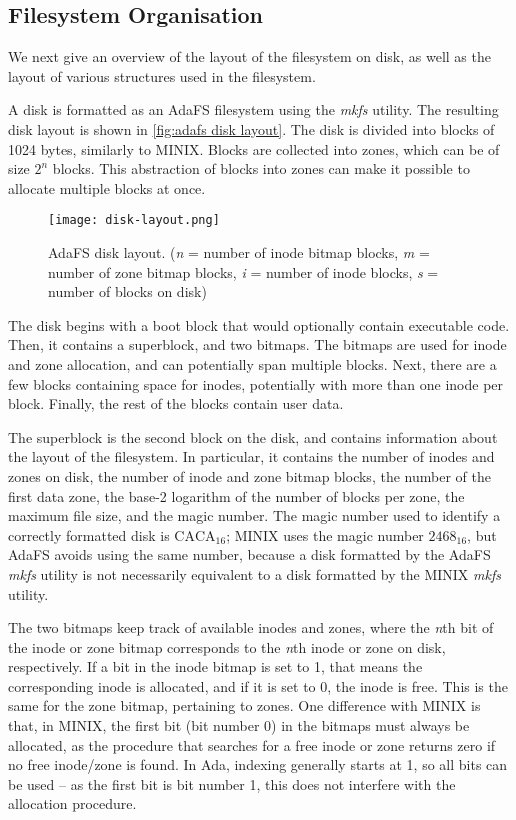 \subsection{Filesystem Organisation}
We next give an overview of the layout of the filesystem on disk, as well as the layout of various structures used in the filesystem.

A disk is formatted as an AdaFS filesystem using the \textit{mkfs} utility.
The resulting disk layout is shown in \autoref{fig:adafs disk layout}.
The disk is divided into blocks of 1024 bytes, similarly to MINIX.
Blocks are collected into zones, which can be of size $2^n$ blocks.
This abstraction of blocks into zones can make it possible to allocate multiple blocks at once.

\begin{figure}[tb]
  \centering
  \texttt{[image: disk-layout.png]}
  \caption{AdaFS disk layout. (\textit{n} = number of inode bitmap blocks, \textit{m} = number of zone bitmap blocks, \textit{i} = number of inode blocks, \textit{s} = number of blocks on disk)}
  \label{fig:adafs disk layout}
\end{figure}

The disk begins with a boot block that would optionally contain executable code.
Then, it contains a superblock, and two bitmaps.
The bitmaps are used for inode and zone allocation, and can potentially span multiple blocks.
Next, there are a few blocks containing space for inodes, potentially with more than one inode per block.
Finally, the rest of the blocks contain user data.

The superblock is the second block on the disk, and contains information about the layout of the filesystem.
In particular, it contains the number of inodes and zones on disk, the number of inode and zone bitmap blocks, the number of the first data zone, the base-2 logarithm of the number of blocks per zone, the maximum file size, and the magic number.
The magic number used to identify a correctly formatted disk is $\text{CACA}_{16}$; MINIX uses the magic number $2468_{16}$, but AdaFS avoids using the same number, because a disk formatted by the AdaFS \textit{mkfs} utility is not necessarily equivalent to a disk formatted by the MINIX \textit{mkfs} utility.

The two bitmaps keep track of available inodes and zones, where the \textit{n}th bit of the inode or zone bitmap corresponds to the \textit{n}th inode or zone on disk, respectively.
If a bit in the inode bitmap is set to 1, that means the corresponding inode is allocated, and if it is set to 0, the inode is free.
This is the same for the zone bitmap, pertaining to zones.
One difference with MINIX is that, in MINIX, the first bit (bit number 0) in the bitmaps must always be allocated, as the procedure that searches for a free inode or zone returns zero if no free inode/zone is found.
In Ada, indexing generally starts at 1, so all bits can be used -- as the first bit is bit number 1, this does not interfere with the allocation procedure.

